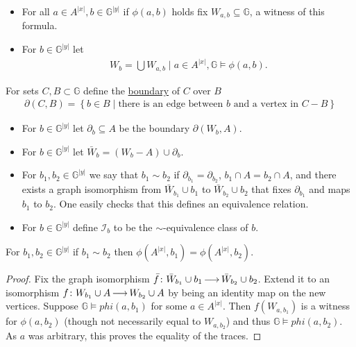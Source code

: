 \documentclass{amsart}
\newcommand{\II}{\mathscr I}
\newcommand{\GG}{\mathbb G}
\newcommand{\GGY}{\GG^{|y|}}
\newcommand{\AX}{A^{|x|}}
\newcommand{\defn}{\underline}
\newcommand{\ppp}{\partial}
\newcommand{\curly}[1]{\left\{#1\right\}}
\begin{document}
\begin{Definition}
  \begin{itemize}
  \item For all $a \in \AX, b \in \GGY$ if $\phi(a, b)$ holds fix $W_{a,b} \subseteq \GG$, a witness of this formula.
  \item For $b \in \GGY$ let 
    \begin{align*}
      W_b = \bigcup {W_{a,b} \mid a \in \AX, \GG \models \phi(a,b)}.
    \end{align*}
  \end{itemize}
\end{Definition}

\begin{Definition}
  For sets $C, B \subset \GG$ define the \defn{boundary} of $C$ over $B$
  \begin{align*}
    \partial(C, B) = \curly{b \in B \mid \text{there is an edge between $b$ and a vertex in $C - B$}}
  \end{align*}
\end{Definition}

\begin{Definition}
  \begin{itemize}
  \item For $b \in \GGY$ let $\partial_b \subseteq A$ be the boundary $\partial(W_b, A)$.
  \item For $b \in \GGY$ let $\bar W_b = (W_b - A) \cup \ppp_b$.
  \item For $b_1, b_2 \in \GGY$ we say that $b_1 \sim b_2$ if $\ppp_{b_1} = \ppp_{b_2}$,
    $b_1 \cap A = b_2 \cap A$,
    and there exists a graph isomorphism from $\bar W_{b_1} \cup b_1$ to $\bar W_{b_2} \cup b_2$ that fixes $\ppp_{b_1}$ and
    maps $b_1$ to $b_2$.
    One easily checks that this defines an equivalence relation.
  \item For $b \in \GGY$ define $\II_b$ to be the $\sim$-equivalence class of $b$.
  \end{itemize}
\end{Definition}

\begin{Lemma} \label {bound_trace}
  For $b_1, b_2 \in \GGY$ if $b_1 \sim b_2$ then $\phi(\AX, b_1) = \phi(\AX, b_2)$.
\end{Lemma}

\begin{proof}
  Fix the graph isomorphism $\bar f \colon \bar W_{b_1} \cup b_1 \operatorname{\longrightarrow} \bar W_{b_2} \cup b_2$.
  Extend it to an isomorphism $f \colon W_{b_1} \cup A \operatorname{\longrightarrow} W_{b_2} \cup A$ by being an identity map on the new vertices.
  Suppose $\GG \models phi(a, b_1)$ for some $a \in \AX$.
  Then $f(W_{a, b_1})$ is a witness for  $\phi(a, b_2)$ (though not necessarily equal to $W_{a, b_2}$)
  and thus $\GG \models phi(a, b_2)$.
  As $a$ was arbitrary, this proves the equality of the traces.
\end{proof}
\end{document}
